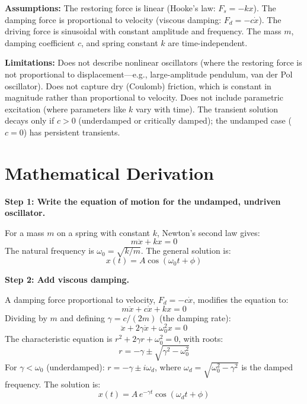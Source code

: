 \textbf{Assumptions:} The restoring force is linear (Hooke's law: $F_s = -kx$). The damping force is proportional to velocity (viscous damping: $F_d = -c\dot{x}$). The driving force is sinusoidal with constant amplitude and frequency. The mass $m$, damping coefficient $c$, and spring constant $k$ are time-independent.


\textbf{Limitations:} Does not describe nonlinear oscillators (where the restoring force is not proportional to displacement---e.g., large-amplitude pendulum, van der Pol oscillator). Does not capture dry (Coulomb) friction, which is constant in magnitude rather than proportional to velocity. Does not include parametric excitation (where parameters like $k$ vary with time). The transient solution decays only if $c > 0$ (underdamped or critically damped); the undamped case ($c = 0$) has persistent transients.


\section*{Mathematical Derivation}

\textbf{Step 1: Write the equation of motion for the undamped, undriven oscillator.}

For a mass $m$ on a spring with constant $k$, Newton's second law gives:
\begin{equation}
m\ddot{x} + kx = 0
\end{equation}
The natural frequency is $\omega_0 = \sqrt{k/m}$. The general solution is:
\begin{equation}
x(t) = A\cos(\omega_0 t + \phi)
\end{equation}

\textbf{Step 2: Add viscous damping.}

A damping force proportional to velocity, $F_d = -c\dot{x}$, modifies the equation to:
\begin{equation}
m\ddot{x} + c\dot{x} + kx = 0
\end{equation}
Dividing by $m$ and defining $\gamma = c/(2m)$ (the damping rate):
\begin{equation}
\ddot{x} + 2\gamma\dot{x} + \omega_0^2 x = 0
\end{equation}
The characteristic equation is $r^2 + 2\gamma r + \omega_0^2 = 0$, with roots:
\begin{equation}
r = -\gamma \pm \sqrt{\gamma^2 - \omega_0^2}
\end{equation}
For $\gamma < \omega_0$ (underdamped): $r = -\gamma \pm i\omega_d$, where $\omega_d = \sqrt{\omega_0^2 - \gamma^2}$ is the damped frequency. The solution is:
\begin{equation}
x(t) = A\,e^{-\gamma t}\cos(\omega_d t + \phi)
\end{equation}

